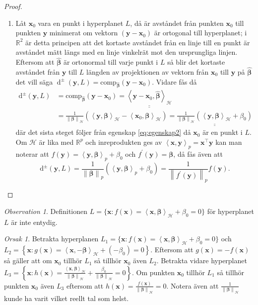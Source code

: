 \documentclass[a4paper, 12pt]{report}
\theoremstyle{definition}
\theoremstyle{remark}
\newtheorem*{rem}{Observation}
\newtheorem*{reas}{Orsak}
\newcommand{\bfbeta}{{\boldsymbol{\beta}}}
\newcommand{\bfx}{\mathbf{x}}
\newcommand{\bfy}{\mathbf{y}}
\newcommand{\llangle}{\left\langle}
\newcommand{\rrangle}{\right\rangle}
\newcommand{\sephyp}{\{ \mathbf{x} : f\left(\mathbf{x}\right)=\inner{\bfx}{\bfbeta}_\mathcal{H} + \beta_0=0\}}
\newcommand{\inner}[2]{\llangle #1, #2 \rrangle}
\newcommand{\hil}{\mathcal{H}}
\begin{document}
\begin{proof}
\begin{enumerate}
	\item Låt $\mathbf{x}_0$ vara en punkt i hyperplanet $L$, då är avståndet från punkten $\bfx_0$ till punkten $\bfy$ minimerat om vektorn $\left(\bfy-\bfx_0\right)$ är ortogonal till hyperplanet; i $\mathbb{R}^2$ är detta principen att det kortaste avståndet från en linje till en punkt är avståndet mätt längs med en linje vinkelrät mot den ursprungliga linjen.
	Eftersom att $\widehat{\bfbeta}$ är ortonormal till varje punkt i $L$ så blir det kortaste avståndet från $\bfy$ till $L$ längden av projektionen av vektorn från $\bfx_0$ till $\bfy$ på $\widehat{\bfbeta}$ det vill säga $\operatorname{d}^\pm \left(\mathbf{y}, L\right)=\operatorname{comp_{\widehat{\bfbeta}}} \left( \bfy - \mathbf{x}_0 \right)$.
	Vidare fås då
	\begin{align*}
		\operatorname{d^\pm} \left( \bfy, L \right) &= \operatorname{comp_{\widehat{\bfbeta}}} \left( \bfy - \mathbf{x}_0 \right)
		=\underline{\underline{ \inner{\bfy - \mathbf{x}_0}{\widehat{\bfbeta}}_\hil}}\\
		&= \frac{1}{\left\|\bfbeta
\right\|_\hil}\left(\inner{\bfy}{\bfbeta}_\hil - \inner{\bfx_0}{\bfbeta}_\hil\right)=\underline{\underline{\frac{1}{\left\|\bfbeta
\right\|_\hil}\left(\inner{\bfy}{\bfbeta}_\hil + \beta_0\right)}}
	\end{align*}
	där det sista steget följer från egenskap \ref{eq:egenskap2} då $\mathbf{x}_0$ är en punkt i $L$.
	Om $\hil$ är lika med $\mathbb{R}^p$ och inreprodukten ges av $\inner{\bfx}{\bfy}_p=\bfx^\intercal\bfy$ kan man noterar att $f\left(\bfy\right)=\inner{\bfy}{\bfbeta}_p+\beta_0$ och $f^\prime\left(\bfy\right)=\bfbeta$, då fås även att
	\begin{equation*}
		\operatorname{d^\pm} \left( \bfy, L \right)=\frac{1}{\left\|\bfbeta
\right\|_p}\left(\inner{\bfy}{\bfbeta}_p + \beta_0\right)=\frac{1}{\left\|f^\prime\left(\bfy\right)
\right\|_p}f\left(\bfy\right).
	\end{equation*}
	\qedhere
\end{enumerate}
\end{proof}

\begin{rem}
	Definitionen $L=\{ \mathbf{x} : f\left(\mathbf{x}\right)=\inner{\bfx}{\bfbeta}_\hil + \beta_0=0\}$ för hyperplanet $L$ är inte entydig.
\end{rem}
\begin{reas}
	Betrakta hyperplanen $L_1 = \sephyp$ och $L_2 = \left\{\mathbf{x}: g\left(\mathbf{x}\right)=\inner{\bfx}{-\bfbeta}_\hil + \left(-\beta_0\right) = 0\right\}$. Eftersom att $g\left(\mathbf{x}\right) = -f\left(\mathbf{x}\right)$ så gäller att om $\mathbf{x}_0$ tillhör $L_1$ så tillhör $\mathbf{x}_0$ även $L_2$.
	Betrakta vidare hyperplanet $L_3= \left\{\mathbf{x}: h\left(\mathbf{x}\right)=\frac{\inner{\bfx}{\bfbeta}_\hil}{\left\|\bfbeta
\right\|_\hil} + \frac{\beta_0}{\left\|\bfbeta
\right\|_\hil}=0\right\}$. Om punkten $\mathbf{x}_0$ tillhör $L_1$ så tillhör punkten $\mathbf{x}_0$ även $L_3$ eftersom att $h\left(\mathbf{x}\right) = \frac{f\left(\mathbf{x}\right)}{\left\|\bfbeta
\right\|_\hil}=0$. Notera även att $\frac{1}{\left\|\bfbeta
\right\|_\hil}$ kunde ha varit vilket reellt tal som helst.
\end{reas}
\end{document}
